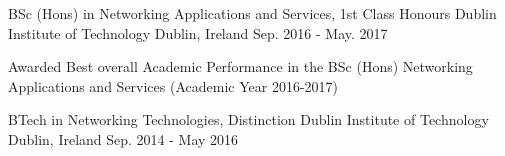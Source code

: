 

\begin{cventries}

  \cventry
    {BSc (Hons) in Networking Applications and Services, 1st Class Honours} %
    {Dublin Institute of Technology } %
    {Dublin, Ireland} %
    {Sep. 2016 - May. 2017} %
    {
      \begin{cvitems} %
        \item {Awarded Best overall Academic Performance in the BSc (Hons) Networking Applications and Services 
        (Academic Year 2016-2017)}
      \end{cvitems}
    }
    
  \cventry
    {BTech in Networking Technologies, Distinction} %
    {Dublin Institute of Technology } %
    {Dublin, Ireland} %
    {Sep. 2014 - May 2016} %
    {}    

\end{cventries}

